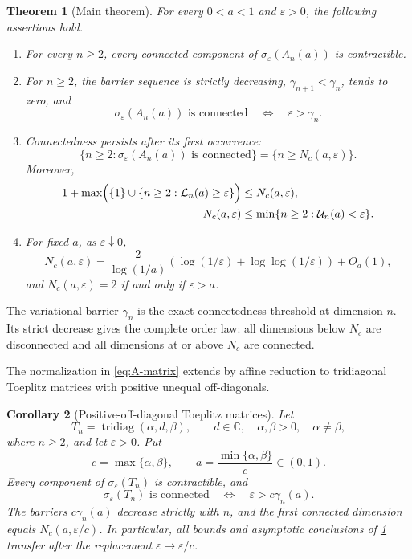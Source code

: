 \documentclass[a4paper,preprint,12pt,nopreprintline,sort&compress]{elsarticle}
\numberwithin{equation}{section}
\newtheorem{theorem}{Theorem}[section]
\newtheorem{corollary}[theorem]{Corollary}
\theoremstyle{remark}
\DeclareMathOperator{\tridiag}{tridiag}
\newcommand{\C}{\mathbb C}
\begin{document}
\begin{theorem}[Main theorem]\label{thm:main}
For every $0<a<1$ and $\varepsilon>0$, the following assertions hold.
\begin{enumerate}
\item For every $n\geq2$, every connected component of
$\sigma_\varepsilon(A_n(a))$ is
contractible.
\item For $n\geq2$, the barrier sequence is strictly decreasing,
$\gamma_{n+1}<\gamma_n$, tends to zero, and
\[
 \sigma_\varepsilon(A_n(a))\text{ is connected}
 \quad\Longleftrightarrow\quad \varepsilon>\gamma_n.
\]
\item Connectedness persists after its first occurrence:
\[
 \{n\geq2:\sigma_\varepsilon(A_n(a))\text{ is connected}\}
 =\{n\geq N_c(a,\varepsilon)\}.
\]
Moreover,
\begin{equation}\label{eq:N-two-sided-main}
 \begin{aligned}
  1+\max\Bigl(\{1\}\cup
  \{n\geq2:\mathcal L_n(a)\geq\varepsilon\}\Bigr)
  &\leq N_c(a,\varepsilon),\\
  N_c(a,\varepsilon)
  &\leq\min\{n\geq2:\mathcal U_n(a)<\varepsilon\}.
 \end{aligned}
\end{equation}
\item For fixed $a$, as $\varepsilon\downarrow0$,
\begin{equation}\label{eq:N-asymptotic-main}
 N_c(a,\varepsilon)=\frac{2}{\log(1/a)}
 \left(\log(1/\varepsilon)+\log\!\log(1/\varepsilon)\right)+O_a(1),
\end{equation}
and $N_c(a,\varepsilon)=2$ if and only if $\varepsilon>a$.
\end{enumerate}
\end{theorem}

The variational barrier \(\gamma_n\) is the exact connectedness threshold at
dimension \(n\).  Its strict decrease gives the complete order law: all
dimensions below \(N_c\) are disconnected and all dimensions at or above
\(N_c\) are connected.

The normalization in \eqref{eq:A-matrix} extends by affine reduction to
tridiagonal Toeplitz matrices with positive unequal off-diagonals.

\begin{corollary}[Positive-off-diagonal Toeplitz matrices]
\label{cor:general-toeplitz}
Let
\[
 T_n=\tridiag(\alpha,d,\beta),\qquad
 d\in\C,\quad \alpha,\beta>0,\quad \alpha\ne\beta,
\]
where \(n\geq2\), and let \(\varepsilon>0\).  Put
\[
 c=\max\{\alpha,\beta\},\qquad
 a=\frac{\min\{\alpha,\beta\}}{c}\in(0,1).
\]
Every component of \(\sigma_\varepsilon(T_n)\) is contractible, and
\[
 \sigma_\varepsilon(T_n)\text{ is connected}
 \quad\Longleftrightarrow\quad
 \varepsilon>c\gamma_n(a).
\]
The barriers \(c\gamma_n(a)\) decrease strictly with \(n\), and the first
connected dimension equals \(N_c(a,\varepsilon/c)\).  In particular, all
bounds and asymptotic conclusions of \cref{thm:main} transfer after the
replacement \(\varepsilon\mapsto\varepsilon/c\).
\end{corollary}
\end{document}

